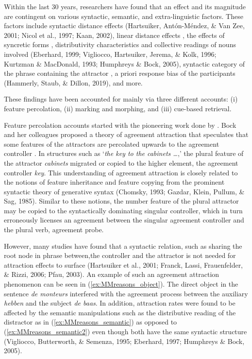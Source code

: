 Within the last 30 years, researchers have found that an effect and its magnitude are contingent on various syntactic, semantic, and extra-linguistic factors. These factors include syntactic distance effects (Hartsuiker, Ant{\'o}n-M{\'e}ndez, \& Van Zee, 2001; Nicol et al., 1997; Kaan, 2002), linear distance effects \citep{Pearlmutter2000,BockCutting1992}, the effects of syncretic forms \citep{Slioussar2018}, distributivity characteristics and collective readings of nouns involved (Eberhard, 1999; Vigliocco, Hartsuiker, Jerema, \& Kolk, 1996; Kurtzman \& MacDonald, 1993; Humphreys \& Bock, 2005), syntactic category of the phrase containing the attractor \citep{BockMiller:1991,BockCutting1992}, a priori response bias of the participants (Hammerly, Staub, \& Dillon, 2019), and more.

These findings have been accounted for mainly via three different accounts: (i) feature percolation, (ii) marking and morphing, and (iii) cue-based retrieval. 


Feature percolation accounts started with the pioneering work done by . Bock and her colleagues proposed a theory of agreement attraction that speculates that some features of the attractors are percolated upwards to the agreement controller \citep{BockMiller:1991,BockCutting1992,BockEberhard93}. In structures such as `\emph{the key to the cabinets \ldots{}},' the plural feature of the attractor \emph{cabinets} migrated or copied to the higher element, the agreement controller \emph{key}.  This understanding of agreement attraction is closely related to the notions of feature inheritance and feature copying from the prominent syntactic theory of generative syntax (Chomsky, 1993; Gazdar, Klein, Pullum, \& Sag, 1985). Similar to these notions, the number feature of the plural attractor may be copied to the syntactically dominating singular controller, which in turn erroneously licenses an agreement between the singular agreement controller and the plural verb, agreement probe. 

However, many studies have found that a syntactic relation, such as sharing the root node in phrase between,the controller and the attractor is not needed for attraction effects to surface (Hartsuiker et al., 2001; Franck, Lassi, Frauenfelder, \& Rizzi, 2006; Pfau, 2003). An example of such an agreement attraction phenomenon can be seen in (\ref{ex:MMreasons_object}). The direct object in the sentence \emph{de monteurs} interfered with the agreement process between the auxiliary \emph{hebben} and the subject \emph{de baas}. In addition, attraction rates were found to be affected by the semantic manipulations such as the distributive reading of the distractor as in (\ref{ex:MMreasons_semantic}) as opposed to (\ref{ex:MMreasons_semantic2}) even though both have the same syntactic structure (Vigliocco, Butterworth, \& Semenza, 1995; Eberhard, 1997; Humphreys \& Bock, 2005). 

